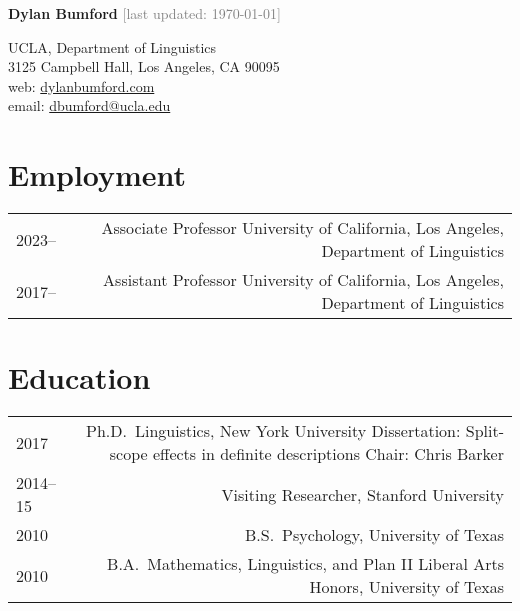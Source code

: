 \documentclass[12pt]{article}
\begin{document}
\textbf{Dylan Bumford}\hfill
\textcolor{gray}{[last updated: \today]}

\bigskip

\begin{minipage}[t]{0.55\textwidth}
UCLA, Department of Linguistics\\
3125 Campbell Hall, Los Angeles, CA 90095
\\
web: \href{https://dylanbumford.com}{dylanbumford.com}\\
email: \href{mailto:dbumford@ucla.edu}{dbumford@ucla.edu}
\end{minipage}
\begin{minipage}[t]{\linegoal}
\raggedleft%
\end{minipage}

\bigskip
\bigskip

\section*{Employment}

\begin{longtable}{LR}
  2023--    & Associate Professor\newline
              University of California, Los Angeles, Department of Linguistics
  \\
  2017--    & Assistant Professor\newline
              University of California, Los Angeles, Department of Linguistics
\end{longtable}

\medskip

\section*{Education}

\begin{longtable}{LR}
  2017        & Ph.D.~Linguistics, New York University\newline
                Dissertation: Split-scope effects in definite descriptions\newline
                Chair: Chris Barker
  \\
  2014--15    & Visiting Researcher, Stanford University\\
  2010        & B.S.~Psychology, University of Texas\\
  2010        & B.A.~Mathematics, Linguistics, and Plan II Liberal Arts Honors, University of Texas
\end{longtable}
\end{document}
